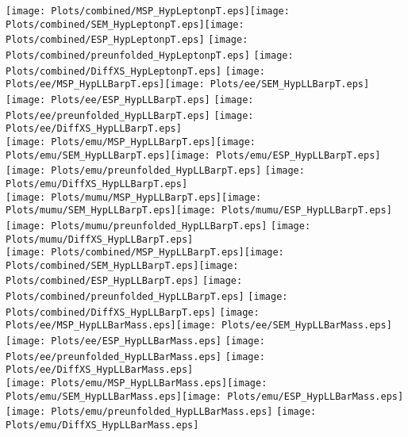 \documentclass[a4paper,10pt]{article}
\begin{document}
\texttt{[image: Plots/combined/MSP\_HypLeptonpT.eps]}\texttt{[image: Plots/combined/SEM\_HypLeptonpT.eps]}\texttt{[image: Plots/combined/ESP\_HypLeptonpT.eps]} \texttt{[image: Plots/combined/preunfolded\_HypLeptonpT.eps]} \texttt{[image: Plots/combined/DiffXS\_HypLeptonpT.eps]}
\newpage
\texttt{[image: Plots/ee/MSP\_HypLLBarpT.eps]}\texttt{[image: Plots/ee/SEM\_HypLLBarpT.eps]}\texttt{[image: Plots/ee/ESP\_HypLLBarpT.eps]} \texttt{[image: Plots/ee/preunfolded\_HypLLBarpT.eps]} \texttt{[image: Plots/ee/DiffXS\_HypLLBarpT.eps]}\\
\texttt{[image: Plots/emu/MSP\_HypLLBarpT.eps]}\texttt{[image: Plots/emu/SEM\_HypLLBarpT.eps]}\texttt{[image: Plots/emu/ESP\_HypLLBarpT.eps]} \texttt{[image: Plots/emu/preunfolded\_HypLLBarpT.eps]} \texttt{[image: Plots/emu/DiffXS\_HypLLBarpT.eps]}\\
\texttt{[image: Plots/mumu/MSP\_HypLLBarpT.eps]}\texttt{[image: Plots/mumu/SEM\_HypLLBarpT.eps]}\texttt{[image: Plots/mumu/ESP\_HypLLBarpT.eps]} \texttt{[image: Plots/mumu/preunfolded\_HypLLBarpT.eps]} \texttt{[image: Plots/mumu/DiffXS\_HypLLBarpT.eps]}\\
\texttt{[image: Plots/combined/MSP\_HypLLBarpT.eps]}\texttt{[image: Plots/combined/SEM\_HypLLBarpT.eps]}\texttt{[image: Plots/combined/ESP\_HypLLBarpT.eps]} \texttt{[image: Plots/combined/preunfolded\_HypLLBarpT.eps]} \texttt{[image: Plots/combined/DiffXS\_HypLLBarpT.eps]}
\newpage
\texttt{[image: Plots/ee/MSP\_HypLLBarMass.eps]}\texttt{[image: Plots/ee/SEM\_HypLLBarMass.eps]}\texttt{[image: Plots/ee/ESP\_HypLLBarMass.eps]} \texttt{[image: Plots/ee/preunfolded\_HypLLBarMass.eps]} \texttt{[image: Plots/ee/DiffXS\_HypLLBarMass.eps]}\\
\texttt{[image: Plots/emu/MSP\_HypLLBarMass.eps]}\texttt{[image: Plots/emu/SEM\_HypLLBarMass.eps]}\texttt{[image: Plots/emu/ESP\_HypLLBarMass.eps]} \texttt{[image: Plots/emu/preunfolded\_HypLLBarMass.eps]} \texttt{[image: Plots/emu/DiffXS\_HypLLBarMass.eps]}\\
\end{document}
